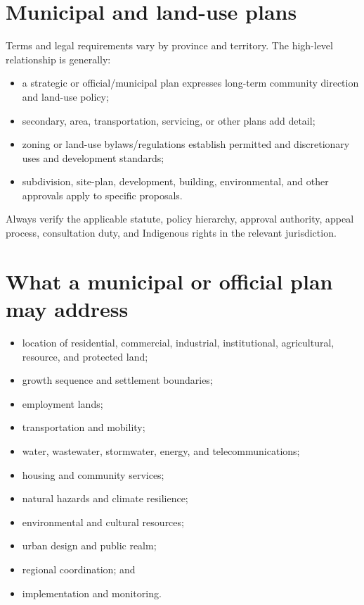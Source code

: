 \documentclass[11pt,letterpaper,oneside,openany]{book}
\begin{document}
\section[Municipal and land-use plans]{Municipal and land-use plans}
Terms and legal requirements vary by province and territory. The high-level relationship is generally:


\begin{itemize}
\item a strategic or official/municipal plan expresses long-term community direction and land-use policy;
\item secondary, area, transportation, servicing, or other plans add detail;
\item zoning or land-use bylaws/regulations establish permitted and discretionary uses and development standards;
\item subdivision, site-plan, development, building, environmental, and other approvals apply to specific proposals.
\end{itemize}


Always verify the applicable statute, policy hierarchy, approval authority, appeal process, consultation duty, and Indigenous rights in the relevant jurisdiction.


\section[What a municipal or official plan may address]{What a municipal or official plan may address}
\begin{itemize}
\item location of residential, commercial, industrial, institutional, agricultural, resource, and protected land;
\item growth sequence and settlement boundaries;
\item employment lands;
\item transportation and mobility;
\item water, wastewater, stormwater, energy, and telecommunications;
\item housing and community services;
\item natural hazards and climate resilience;
\item environmental and cultural resources;
\item urban design and public realm;
\item regional coordination; and
\item implementation and monitoring.
\end{itemize}
\end{document}
